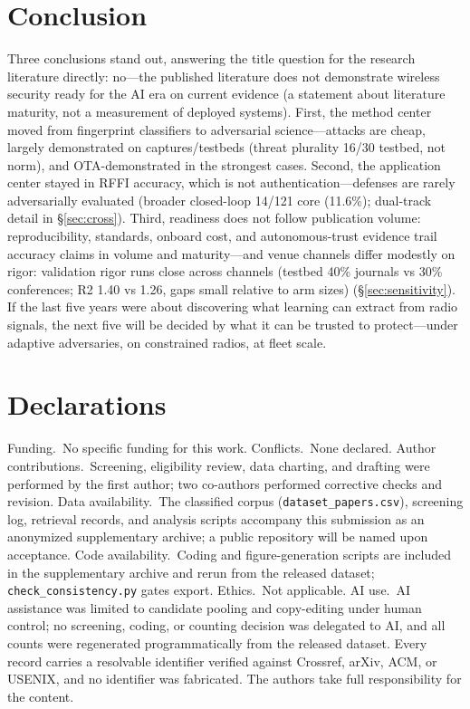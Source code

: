 \documentclass[11pt,a4paper]{article}
\begin{document}
\section{Conclusion}
\label{sec:conclusion}
Three conclusions stand out, answering the title question for the research literature directly: no---the published literature does not demonstrate wireless security ready for the AI era on current evidence (a statement about literature maturity, not a measurement of deployed systems). First, the method center moved from fingerprint classifiers to adversarial science---attacks are cheap, largely demonstrated on captures/testbeds (threat plurality 16/30 testbed, not norm), and OTA-demonstrated in the strongest cases. Second, the application center stayed in RFFI accuracy, which is not authentication---defenses are rarely adversarially evaluated (broader closed-loop 14/121 core (11.6\%); dual-track detail in \S\ref{sec:cross}). Third, readiness does not follow publication volume: reproducibility, standards, onboard cost, and autonomous-trust evidence trail accuracy claims in volume and maturity---and venue channels differ modestly on rigor: validation rigor runs close across channels (testbed 40\% journals vs 30\% conferences; R2 1.40 vs 1.26, gaps small relative to arm sizes) (\S\ref{sec:sensitivity}). If the last five years were about discovering what learning can extract from radio signals, the next five will be decided by what it can be trusted to protect---under adaptive adversaries, on constrained radios, at fleet scale.

\section*{Declarations}
Funding.\ No specific funding for this work. Conflicts.\ None declared. Author contributions.\ Screening, eligibility review, data charting, and drafting were performed by the first author; two co-authors performed corrective checks and revision. Data availability.\ The classified corpus (\texttt{dataset\_papers.csv}), screening log, retrieval records, and analysis scripts accompany this submission as an anonymized supplementary archive; a public repository will be named upon acceptance. Code availability.\ Coding and figure-generation scripts are included in the supplementary archive and rerun from the released dataset; \texttt{check\_consistency.py} gates export. Ethics.\ Not applicable. AI use.\ AI assistance was limited to candidate pooling and copy-editing under human control; no screening, coding, or counting decision was delegated to AI, and all counts were regenerated programmatically from the released dataset. Every record carries a resolvable identifier verified against Crossref, arXiv, ACM, or USENIX, and no identifier was fabricated. The authors take full responsibility for the content.
\end{document}
